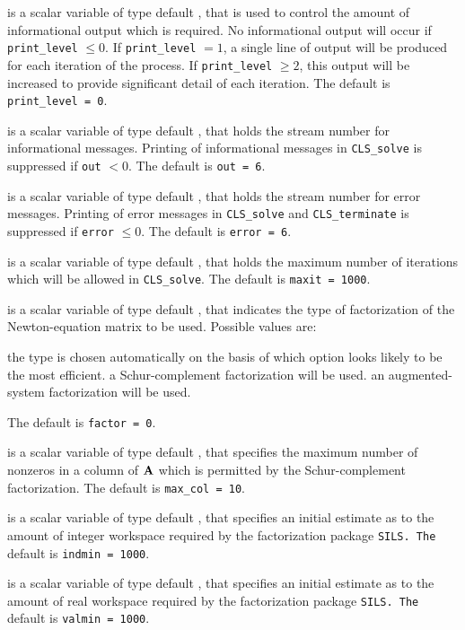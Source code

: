 \documentclass{galahad}
\newcommand{\packagename}{CLS}
\begin{document}
\begin{description}

 is a scalar variable of type default \integer, that is used
to control the amount of informational output which is required. No 
informational output will occur if {\tt print\_level} $\leq 0$. If 
{\tt print\_level} $= 1$, a single line of output will be produced for each
iteration of the process. If {\tt print\_level} $\geq 2$, this output will be
increased to provide significant detail of each iteration.
The default is {\tt print\_level = 0}.

 is a scalar variable of type default \integer, that holds the
stream number for informational messages. Printing of informational messages in 
{\tt \packagename\_solve} is suppressed if {\tt out} $< 0$.
The default is {\tt out = 6}.

 is a scalar variable of type default \integer, that holds the
stream number for error messages. Printing of error messages in 
{\tt \packagename\_solve} and {\tt \packagename\_terminate} is suppressed if 
{\tt error} $\leq 0$.
The default is {\tt error = 6}.

 is a scalar variable of type default \integer, that holds the
maximum number of iterations which will be allowed in {\tt \packagename\_solve}.
The default is {\tt maxit = 1000}.

 is a scalar variable of type default \integer, that indicates
the type of factorization of the Newton-equation matrix to be used.  
Possible values are:

\begin{description}
 the type is chosen automatically on the basis of which option looks
        likely to be the most efficient.
 a Schur-complement factorization will be used.
 an augmented-system factorization will be used.
\end{description}
The default is {\tt factor = 0}.

 is a scalar variable of type default \integer, that specifies
the maximum number of nonzeros in a column of ${\mathbf{A}}$ which is permitted
by the Schur-complement factorization.
The default is {\tt max\_col = 10}.

 is a scalar variable of type default \integer, that specifies
an initial estimate as to the amount of integer workspace required by 
the factorization package {\tt SILS.
The} default is {\tt indmin = 1000}.

 is a scalar variable of type default \integer, that specifies
an initial estimate as to the amount of real workspace required by 
the factorization package {\tt SILS.
The} default is {\tt valmin = 1000}.


\end{description}
\end{document}
